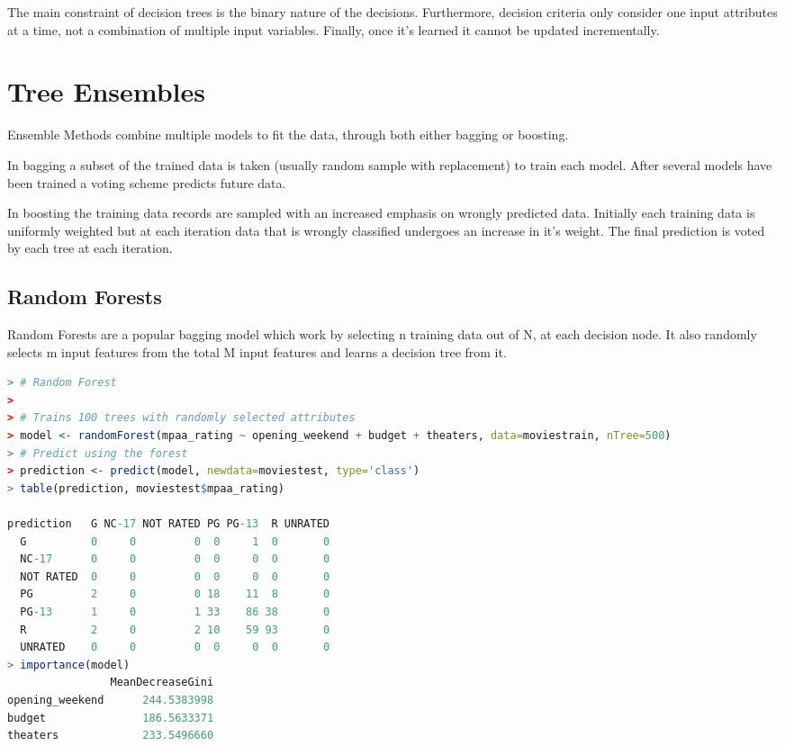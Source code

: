 \documentclass{article}
\begin{document}
\begin{spacing}{1.1}
\vspace{3mm}

The main constraint of decision trees is the binary nature of the decisions.  Furthermore, decision criteria only consider one input attributes at a time, not a combination of multiple input variables.  Finally, once it's learned it cannot be updated incrementally.  

\section{Tree Ensembles}

Ensemble Methods combine multiple models to fit the data, through both either bagging or boosting.  

\vspace{3mm}

In bagging a subset of the trained data is taken (usually random sample with replacement) to train each model.  After several models have been trained a voting scheme predicts future data.  

\vspace{3mm}

In boosting the training data records are sampled with an increased emphasis on wrongly predicted data.  Initially each training data is uniformly weighted but at each iteration data that is wrongly classified undergoes an increase in it's weight.  The final prediction is voted by each tree at each iteration.  


\subsection{Random Forests}

Random Forests are a popular bagging model which work by selecting n training data out of N, at each decision node.  It also randomly selects m input features from the total M input features and learns a decision tree from it.  

\vspace{3mm}

\begin{lstlisting}[language=R]
> # Random Forest
> 
> # Trains 100 trees with randomly selected attributes
> model <- randomForest(mpaa_rating ~ opening_weekend + budget + theaters, data=moviestrain, nTree=500)
> # Predict using the forest
> prediction <- predict(model, newdata=moviestest, type='class')
> table(prediction, moviestest$mpaa_rating)
           
prediction   G NC-17 NOT RATED PG PG-13  R UNRATED
  G          0     0         0  0     1  0       0
  NC-17      0     0         0  0     0  0       0
  NOT RATED  0     0         0  0     0  0       0
  PG         2     0         0 18    11  8       0
  PG-13      1     0         1 33    86 38       0
  R          2     0         2 10    59 93       0
  UNRATED    0     0         0  0     0  0       0
> importance(model)
                MeanDecreaseGini
opening_weekend      244.5383998
budget               186.5633371
theaters             233.5496660
\end{lstlisting}


\end{spacing}
\end{document}
